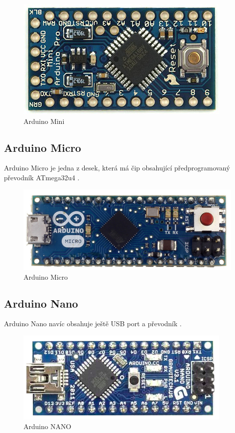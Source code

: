 			\begin{figure}[!h]
  \begin{center}
    \includegraphics[scale=0.5]{obrazky/emded_arduino_mini}
  \end{center}
  \caption{Arduino Mini \cite{ArduinoMini}}
\end{figure}
	
	\subsection{Arduino Micro} 
	Arduino Micro je jedna z desek, která má čip obsahující předprogramovaný převodník ATmega32u4 \cite{ArduinoMicro}.	 
	
		\begin{figure}[!h]
  \begin{center}
    \includegraphics[scale=0.2]{obrazky/emded_arduino_micro}
  \end{center}
  \caption{Arduino Micro \cite{ArduinoMicro}}
\end{figure}
	
	\subsection{Arduino Nano} 
	Arduino Nano navíc obsahuje ještě USB port a převodník \cite{ArduinoNano}.	
	
	\begin{figure}[!h]
  \begin{center}
    \includegraphics[scale=0.5]{obrazky/emded_arduino_nano}
  \end{center}
  \caption{Arduino NANO \cite{ArduinoNano}}
\end{figure}
	
